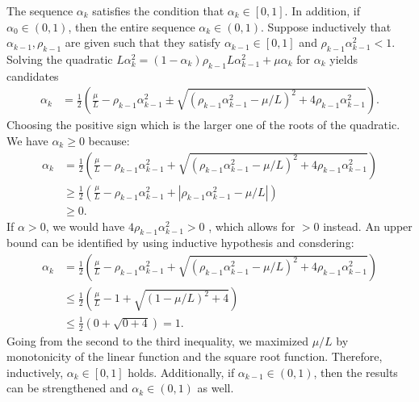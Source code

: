 \documentclass[12pt]{article}
\begin{document}
    \begin{observation}\label{obs:r-wapg-observation-1}
        The sequence $\alpha_k$ satisfies the condition that $\alpha_k \in [0, 1]$.
        In addition, if $\alpha_0 \in (0, 1)$, then the entire sequence $\alpha_k \in (0, 1)$. 
        Suppose inductively that $\alpha_{k - 1}, \rho_{k - 1}$ are given such that they satisfy $\alpha_{k -1} \in [0, 1]$ and $\rho_{k - 1} \alpha_{k - 1}^2 < 1$. 
        Solving the quadratic $L\alpha_k^2=(1 - \alpha_k)\rho_{k - 1}L\alpha_{k - 1}^2 + \mu \alpha_k$ for $\alpha_k$ yields candidates 
        $$
        \begin{aligned}
            \alpha_k &= 
            \frac{1}{2}\left(
                \frac{\mu}{L} - \rho_{k - 1}\alpha_{k - 1}^2 
                \pm
                \sqrt{(\rho_{k - 1}\alpha_{k - 1}^2 - \mu/L)^2 + 4\rho_{k - 1}\alpha_{k - 1}^2}
            \right). 
        \end{aligned}
        $$
        Choosing the positive sign which is the larger one of the roots of the quadratic. 
        We have $\alpha_k \ge 0$ because: 
        $$
        \begin{aligned}
            \alpha_k &=
            \frac{1}{2}\left(
                \frac{\mu}{L} - \rho_{k - 1}\alpha_{k - 1}^2 
                +
                \sqrt{(\rho_{k - 1}\alpha_{k - 1}^2 - \mu/L)^2 + 4\rho_{k - 1}\alpha_{k - 1}^2}
            \right)
            \\
            &\ge 
            \frac{1}{2}\left(
                \frac{\mu}{L} - \rho_{k - 1}\alpha_{k - 1}^2 
                +
                \left|\rho_{k - 1}\alpha_{k - 1}^2 - \mu/L\right|
            \right)
            \\
            & \ge 0. 
        \end{aligned}
        $$
        If $\alpha> 0$, we would have $4\rho_{k - 1} \alpha_{k - 1}^2 > 0$ , which allows for $> 0$ instead. 
        An upper bound can be identified by using inductive hypothesis and consdering: 
        $$
        \begin{aligned}
            \alpha_k &= 
            \frac{1}{2}\left(
                \frac{\mu}{L} - \rho_{k - 1}\alpha_{k - 1}^2 
                +
                \sqrt{(\rho_{k - 1}\alpha_{k - 1}^2 - \mu/L)^2 + 4\rho_{k - 1}\alpha_{k - 1}^2}
            \right)
            \\
            &\le 
            \frac{1}{2}\left(
                \frac{\mu}{L} - 1
                +
                \sqrt{(1 - \mu/L)^2 + 4}
            \right)
            \\
            &\le \frac{1}{2}\left(
                0 + \sqrt{0 + 4}
            \right) = 1. 
        \end{aligned}
        $$
        Going from the second to the third inequality, we maximized $\mu/L$ by monotonicity of the linear function and the square root function. 
        Therefore, inductively, $\alpha_k \in [0, 1]$ holds. 
        Additionally, if $\alpha_{k - 1} \in (0, 1)$, then the results can be strengthened and $\alpha_k \in (0, 1)$ as well. 

    \end{observation}
    
\end{document}
